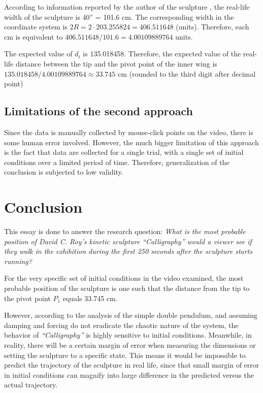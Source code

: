 \documentclass[a4paper,12pt]{article}
\begin{document}
    According to information reported by the author of the sculpture \cite{roy-2021}, the real-life width of the sculpture is 40'' = 101.6 cm. The corresponding width in the coordinate system is $2R=2 \cdot 203.255824=406.511648$ (units). Therefore, each cm is equivalent to $406.511648/101.6= 4.00109889764$ units.

    The expected value of $d_i$ is 135.018458. Therefore, the expected value of the real-life distance between the tip and the pivot point of the inner wing is $135.018458/4.00109889764 \approx 33.745$ cm (rounded to the third digit after decimal point)


\subsection{Limitations of the second approach}

Since the data is manually collected by mouse-click points on the video, there is some human error involved. However, the much bigger limitation of this approach is the fact that data are collected for a single trial, with a single set of initial conditions over a limited period of time. Therefore, generalization of the conclusion is subjected to low validity.

\pagebreak
\section{Conclusion}
This essay is done to answer the research question: \textit{What is the most probable position of David C. Roy’s kinetic sculpture \textit{“Calligraphy”} would a viewer see if they walk in the exhibition during the first 250 seconds after the sculpture starts running?}

For the very specific set of initial conditions in the video examined, the most probable position of the sculpture is one such that the distance from the tip to the pivot point $P_1$ equals 33.745 cm.

However, according to the analysis of the simple double pendulum, and assuming damping and forcing do not eradicate the chaotic nature of the system, the behavior of \textit{“Calligraphy”} is highly sensitive to initial conditions. Meanwhile, in reality, there will be a certain margin of error when measuring the dimensions or setting the sculpture to a specific state. This means it would be impossible to predict the trajectory of the sculpture in real life, since that small margin of error in initial conditions can magnify into large difference in the predicted versus the actual trajectory. 
\end{document}
